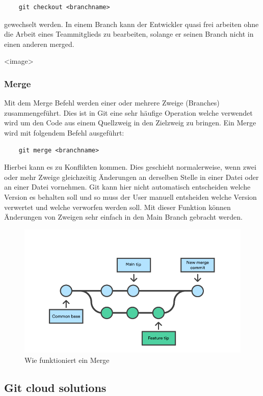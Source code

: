 \begin{verbatim}
    git checkout <branchname>
\end{verbatim}

gewechselt werden.
In einem Branch kann der Entwickler quasi frei arbeiten ohne die Arbeit eines Teammitglieds zu bearbeiten, solange er seinen Branch nicht in einen anderen merged.

<image>

\cite{Github_Branches}

\subsubsection{Merge}

Mit dem Merge Befehl werden einer oder mehrere Zweige (Branches) zusammengeführt. Dies ist in Git eine sehr häufige Operation welche verwendet wird um den Code aus einem Quellzweig in den Zielzweig zu bringen.
Ein Merge wird mit folgendem Befehl ausgeführt: 

\begin{verbatim}
    git merge <branchname>
\end{verbatim}

Hierbei kann es zu Konflikten kommen. Dies geschieht normalerweise, wenn zwei oder mehr Zweige gleichzeitig Änderungen an derselben Stelle in einer Datei oder an einer Datei vornehmen. Git kann hier nicht automatisch entscheiden welche Version es behalten soll und so muss der User manuell entsheiden welche Version verwertet und welche verworfen werden soll. Mit dieser Funktion können Änderungen von Zweigen sehr einfach in den Main Branch gebracht werden.

\begin{figure}[h!]
    \centering
    \includegraphics[width=0.6\linewidth]{pics/merge.png}
    \caption{Wie funktioniert ein Merge}
    \label{fig:enter-label}
\end{figure}

\subsection{Git cloud solutions}

